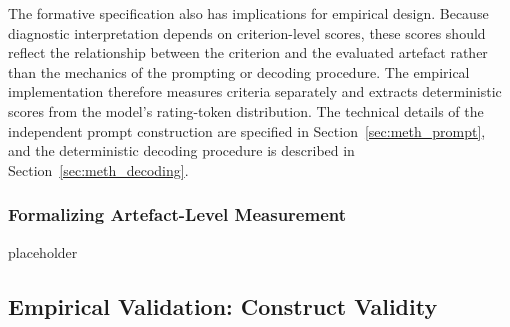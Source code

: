




The formative specification also has implications for empirical design. Because diagnostic interpretation depends on criterion-level scores, these scores should reflect the relationship between the criterion and the evaluated artefact rather than the mechanics of the prompting or decoding procedure. The empirical implementation therefore measures criteria separately and extracts deterministic scores from the model's rating-token distribution. The technical details of the independent prompt construction are specified in Section~\ref{sec:meth_prompt}, and the deterministic decoding procedure is described in Section~\ref{sec:meth_decoding}.


\subsubsection{Formalizing Artefact-Level Measurement}

placeholder


\subsection{Empirical Validation: Construct Validity}\label{sec:empirical_validation}

